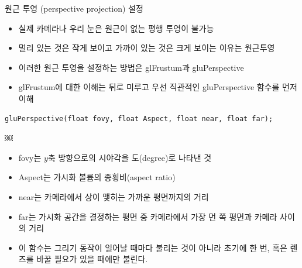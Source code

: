 \documentclass{beamer}
\begin{document}
\begin{frame}[fragile]{원근 투영 (perspective projection) 설정}

{\small
\begin{itemize}
\item 실제 카메라나 우리 눈은 원근이 없는 평행 투영이 불가능
\item 멀리 있는 것은 작게 보이고 가까이 있는 것은 크게 보이는 이유는 원근투영
\item 이러한 원근 투영을 설정하는 방법은 {\sf glFrustum}과 {\sf gluPerspective}
\item {\sf glFrustum}에 대한 이해는 뒤로 미루고 우선 직관적인 {\sf  gluPerspective} 함수를 먼저 이해
\end{itemize}

\begin{verbatim}
gluPerspective(float fovy, float Aspect, float near, float far);
\end{verbatim}

￼
\begin{itemize}
\item {\sf fovy}는 $y$축 방향으로의 시야각을 도(degree)로 나타낸 것
\item {\sf Aspect}는 가시화 볼륨의 종횡비(aspect ratio)
\item {\sf near}는 카메라에서 상이 맺히는 가까운 평면까지의 거리
\item {\sf far}는 가시화 공간을 결정하는 평면 중 카메라에서 가장 먼 쪽 평면과 카메라 사이의 거리
\item 이 함수는 그리기 동작이 일어날 때마다 불리는 것이 아니라 초기에 한 번, 혹은 렌즈를 바꿀 필요가 있을 때에만 불린다.
\end{itemize}
}

\end{frame}
\end{document}
